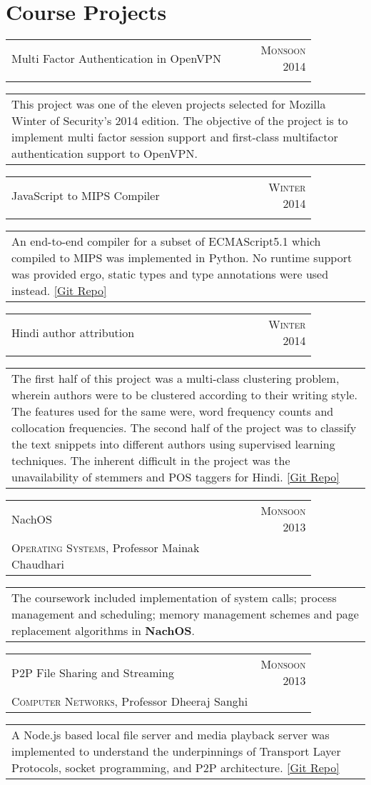 \documentclass[a4paper,10pt]{article} %
\newcommand{\project}[4]{
    \begin{tabular}{p{0.85\linewidth}r}
        \textcolor{NavyBlue}{#2} & \multicolumn{1}{m{3cm}}{\raggedleft \textsc{#1}}\\
        #3
    \end{tabular}
    \begin{tabular}{p{\linewidth}}
        \footnotesize{#4}
    \end{tabular}
    \vspace{-0.1cm}
}
\begin{document}
\section{Course Projects}

\project {Monsoon 2014}
         {Multi Factor Authentication in OpenVPN}
         {\textsc{\raggedright Mozilla Winter of Security}, Guillaume Destuynder and Professor Dheeraj Sanghi}
         {This project was one of the eleven projects selected for Mozilla Winter of Security's 2014 edition.
          The objective of the project is to implement multi factor session
          support and first-class multifactor authentication support to
          OpenVPN.}

\project {Winter 2014}
         {JavaScript to MIPS Compiler}
         {\textsc{\raggedright Compilers}, Professor Subhajit Roy}
         {An end-to-end compiler for a subset of ECMAScript5.1 which compiled to MIPS was implemented in Python.
          No runtime support was provided ergo, static types and type annotations were used instead.
          \href{https://github.com/srijanshetty/javascript-compiler} {[Git Repo]}}

\project {Winter 2014}
         {Hindi author attribution}
         {\textsc{\raggedright Artificial Intelligence}, Professor Amitabha
          Mukherjee}
         {The first half of this project was a multi-class clustering problem,
          wherein authors were to be clustered according to their writing style.
          The features used for the same were, word frequency counts and collocation
          frequencies.  The second half of the project was to classify the text snippets
          into different authors using supervised learning techniques.
          The inherent difficult in the project was the unavailability of stemmers and POS taggers for Hindi.
          \href{https://github.com/srijanshetty/author-attribution} {[Git Repo]}}

\project {Monsoon 2013}
         {NachOS}
         {\textsc{Operating Systems}, Professor Mainak Chaudhari}
         {The coursework included implementation of system calls; process
          management and scheduling; memory management schemes and page replacement
          algorithms in \textbf{NachOS}.}

\project {Monsoon 2013}
         {P2P File Sharing and Streaming}
         {\textsc{Computer Networks}, Professor Dheeraj Sanghi}
         {A Node.js based local file server and media playback server was implemented
          to understand the underpinnings of Transport Layer Protocols, socket programming,
          and P2P architecture.  \href{https://github.com/srijanshetty/nodesock} {[Git Repo]}}
\end{document}
